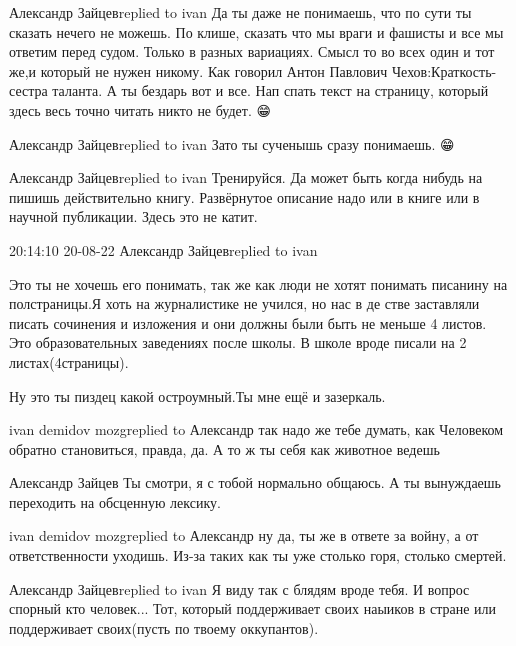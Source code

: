  
 
 
 
 

Александр Зайцевreplied to ivan
Да ты даже не понимаешь, что по сути ты сказать нечего не можешь. По клише, сказать что мы враги и фашисты и все мы ответим перед судом. Только в разных вариациях. Смысл то во всех один и тот же,и который не нужен никому. Как говорил Антон Павлович Чехов:Краткость-сестра таланта. А ты бездарь вот и все. Нап спать текст на страницу, который здесь весь точно читать никто не будет. 😁

Александр Зайцевreplied to ivan
Зато ты сученышь сразу понимаешь. 😁

Александр Зайцевreplied to ivan
Тренируйся. Да может быть когда нибудь на пишишь действительно книгу. Развёрнутое описание надо или в книге или в научной публикации. Здесь это не катит.

20:14:10 20-08-22
Александр Зайцевreplied to ivan

Это ты не хочешь его понимать, так же как люди не хотят понимать писанину на
полстраницы.Я хоть на журналистике не учился, но нас в де стве заставляли
писать сочинения и изложения и они должны были быть не меньше 4 листов. Это
образовательных заведениях после школы. В школе вроде писали на 2
листах(4страницы).

Ну это ты пиздец какой остроумный.Ты мне ещё и зазеркаль.

ivan demidov mozgreplied to Александр
так надо же тебе думать, как Человеком обратно становиться, правда, да. А то ж ты себя как животное ведешь

Александр Зайцев
Ты смотри, я с тобой нормально общаюсь. А ты вынуждаешь переходить на обсценную лексику.

ivan demidov mozgreplied to Александр
ну да, ты же в ответе за войну, а от ответственности уходишь. Из-за таких как ты уже столько горя, столько смертей.

Александр Зайцевreplied to ivan
Я виду так с блядям вроде тебя. И вопрос спорный кто человек... Тот, который поддерживает своих наыиков в стране или поддерживает своих(пусть по твоему оккупантов).

